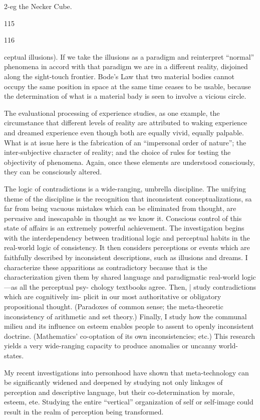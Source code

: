 2-eg the Necker Cube. 


115 


116 


ceptual illusions). If we take the illusions as a paradigm and reinterpret “normal” 
phenomena in accord with that paradigm we are in a different reality, disjoined 
along the sight-touch frontier. Bode's Law that two material bodies cannot occupy 
the same position in space at the same time ceases to be usable, because the 
determination of what is a material bady is seen to involve a vicious circle. 

The evaluational processing of experience studies, as one example, the circumstance 
that different levels of reality are attributed to waking experience and dreamed 
experience even though both are equally vivid, equally palpable. What is at issue 
here is the fabrication of an “impersonal order of nature”; the inter-subjective 
character of reality; and the choice of rules for testing the objectivity of phenomena. 
Again, once these elements are understood consciously, they can be consciously 
altered. 

The logic of contradictions is a wide-ranging, umbrella discipline. The unifying 
theme of the discipline is the recognition that inconsistent conceptualizations, sa 
far from being vacuous mistakes which can be eliminated from thought, are 
pervasive and inescapable in thought as we know it. Conscious control of this state 
of affairs is an extremely powerful achievement. The investigation begins with the 
interdependency between traditional logic and perceptual habits in the real-world 
logic of consistency. It then considers perceptions or events which are faithfully 
described by inconsistent descriptions, such as illusions and dreams. I characterize 
these apparitions as contradictory because that is the characterization given them 
by shared language and paradigmatic real-world logic —as all the perceptual psy- 
chology textbooks agree. Then, | study contradictions which are cognitively im- 
plicit in our most authoritative or obligatory propositional thought. (Paradoxes of 
common sense; the meta-theoretic inconsistency of arithmetic and set theory.) 
Finally, I study how the communal milieu and its influence on esteem enables 
people to assent to openly inconsistent doctrine. (Mathematics’ co-optation of its 
own inconsistencies; etc.) This research yields a very wide-ranging capacity to 
produce anomalies or uncanny world-states. 

My recent investigations into personhood have shown that meta-technology can 
be significantly widened and deepened by studying not only linkages of perception 
and descriptive language, but their co-determination by morale, esteem, ete. 
Studying the entire “vertical” organization of self or self-image could result in the 
realm of perception being transformed. 


